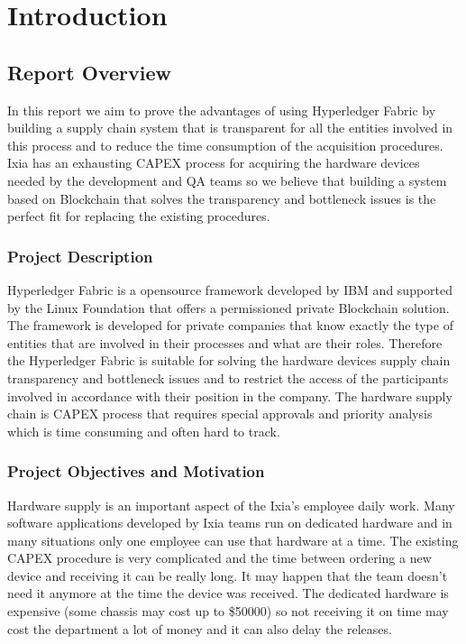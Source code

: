 \chapter{Introduction}
\label{chapter:intro}

\section{Report Overview}
\label{sec:intro-section1}
In this report we aim to prove the advantages of using Hyperledger Fabric by building a supply chain system that is transparent for all the entities involved in this process and to reduce the time consumption of the acquisition procedures.
Ixia has an exhausting CAPEX process for acquiring the hardware devices needed by the development and QA teams so we believe that building a system based on Blockchain that solves the transparency and bottleneck issues is the perfect fit for replacing the existing procedures.
 
\subsection{Project Description}
\label{sub-sec:intro-subsection1}
Hyperledger Fabric is a opensource framework developed by IBM and supported by the Linux Foundation that offers a permissioned private Blockchain solution. 
The framework is developed for private companies that know exactly the type of entities that are involved in their processes and what are their roles.
Therefore the Hyperledger Fabric is suitable for solving the hardware devices supply chain transparency and bottleneck issues and to restrict the access of the participants involved in accordance with their position in the company. The hardware supply chain is CAPEX process that requires special approvals and priority analysis which is time consuming and often hard to track.


\subsection{Project Objectives and Motivation}
\label{sub-sec:intro-subsection2}
Hardware supply is an important aspect of the Ixia's employee daily work. Many software applications developed by Ixia teams run on dedicated hardware and in many situations only one employee can use that hardware at a time.
The existing CAPEX procedure is very complicated and the time between ordering a new device and receiving it can be really long. It may happen that the team doesn't need it anymore at the time the device was received. The dedicated hardware is expensive (some chassis may cost up to \$50000) so not receiving it on time may cost the department a lot of money and it can also delay the releases.

